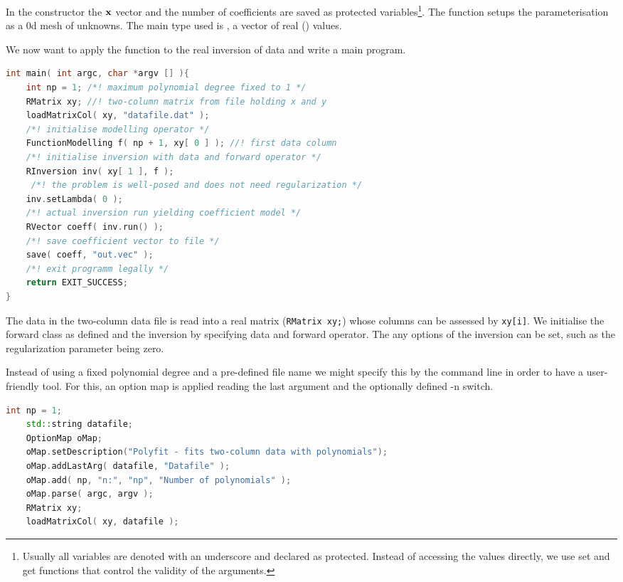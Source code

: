 In the constructor the $\bf x$ vector and the number of coefficients are saved as protected variables\footnote{Usually all variables are denoted with an underscore and declared as protected. Instead of accessing the values directly, we use set and get functions that control the validity of the arguments.}.
The function  setups the parameterisation as a 0d mesh of  unknowns.
The main type used is , a vector of real () values.

We now want to apply the function to the real inversion of data and write a main program.
\begin{lstlisting}[language=C++,morekeywords={RVector,RMatrix,RInversion,EXIT_SUCCESS}]
int main( int argc, char *argv [] ){
    int np = 1; /*! maximum polynomial degree fixed to 1 */
    RMatrix xy; //! two-column matrix from file holding x and y
    loadMatrixCol( xy, "datafile.dat" );
    /*! initialise modelling operator */
    FunctionModelling f( np + 1, xy[ 0 ] ); //! first data column
    /*! initialise inversion with data and forward operator */
    RInversion inv( xy[ 1 ], f );
     /*! the problem is well-posed and does not need regularization */
    inv.setLambda( 0 );
    /*! actual inversion run yielding coefficient model */
    RVector coeff( inv.run() );
    /*! save coefficient vector to file */
    save( coeff, "out.vec" );
    /*! exit programm legally */
    return EXIT_SUCCESS;
}
\end{lstlisting}

The data in the two-column data file is read into a real matrix (\lstinline|RMatrix xy;|) whose columns can be assessed by \lstinline|xy[i]|. We initialise the forward class as defined and the inversion by specifying data and forward operator.
The any options of the inversion can be set, such as the regularization parameter being zero.

Instead of using a fixed polynomial degree and a pre-defined file name we might specify this by the command line in order to have a user-friendly tool.
For this, an option map is applied reading the last argument and the optionally defined -n switch.
\begin{lstlisting}[language=C++]
    int np = 1;
    std::string datafile;
    OptionMap oMap;
    oMap.setDescription("Polyfit - fits two-column data with polynomials");
    oMap.addLastArg( datafile, "Datafile" );
    oMap.add( np, "n:", "np", "Number of polynomials" );
    oMap.parse( argc, argv );
    RMatrix xy; 
    loadMatrixCol( xy, datafile );
\end{lstlisting}

